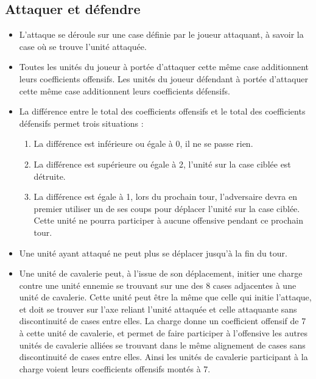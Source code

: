 \documentclass[a4paper]{report}
\begin{document}
\subsection{Attaquer et défendre}
  \begin{itemize}
    \item L'attaque se déroule sur une case définie par le joueur attaquant, à savoir la case où se trouve l'unité attaquée.
    \item Toutes les unités du joueur à portée d'attaquer cette même case additionnent leurs
    coefficients offensifs. Les unités du joueur défendant à portée d'attaquer 
    cette même case additionnent leurs coefficients défensifs.
    \item La différence entre le total des coefficients offensifs et le total des coefficients défensifs permet trois situations :
    	\begin{enumerate}
          \item La différence est inférieure ou égale à 0, il ne se passe rien.
          \item La différence est supérieure ou égale à 2, l'unité sur la case ciblée est détruite.
          \item La différence est égale à 1, lors du prochain tour, l'adversaire devra en premier utiliser un de ses coups pour déplacer l'unité sur la case ciblée. Cette unité ne pourra participer à aucune offensive pendant ce prochain tour.
    	\end{enumerate}
        \item Une unité ayant attaqué ne peut plus se déplacer jusqu'à la fin du tour.
        \item Une unité de cavalerie peut, à l'issue de son déplacement, initier une charge contre une unité ennemie se trouvant sur une des 8 cases adjacentes à une unité de cavalerie. Cette unité peut être la même que celle qui initie l'attaque, et doit se trouver sur l'axe reliant l'unité attaquée et celle attaquante sans discontinuité de cases entre elles. La charge donne un coefficient offensif de 7 à cette unité de cavalerie, et permet de faire participer à l'offensive les autres unités de cavalerie alliées se trouvant dans le même alignement de cases sans discontinuité de cases entre elles. Ainsi les unités de cavalerie participant à la charge voient leurs coefficients offensifs montés à 7.

\end{itemize}
\end{document}
